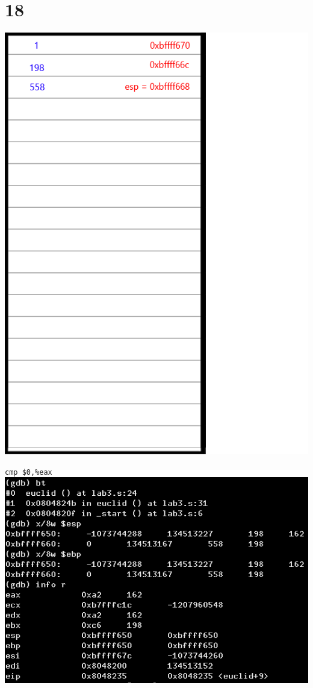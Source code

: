 \documentclass{article}
\begin{document}
\section*{18}
\begin{minipage}{5cm}
\includegraphics[scale=0.3]{s3.png}
\end{minipage}
\begin{minipage}{8cm}
\verb|cmp $0,%eax|\\
\includegraphics[scale=0.4]{bxi18.png} \\
\end{minipage}
\clearpage
\end{document}
